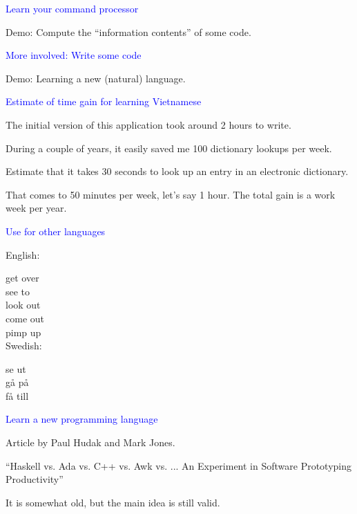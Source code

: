 \documentclass{slides}
\newcommand{\ti}[1]{\begin{center}\Large{\textcolor{blue}{#1}}\end{center}}
\begin{document}
\begin{slide}\ti{Learn your command processor}

Demo: Compute the ``information contents'' of some code.

\vfill\end{slide}
\begin{slide}\ti{More involved: Write some code}

Demo: Learning a new (natural) language.

\vfill\end{slide}
\begin{slide}\ti{Estimate of time gain for learning Vietnamese}

The initial version of this application took around 2 hours to write.

During a couple of years, it easily saved me 100 dictionary lookups
per week.  

Estimate that it takes 30 seconds to look up an entry in an electronic
dictionary.

That comes to 50 minutes per week, let's say 1 hour.  The total gain
is a work week per year.

\vfill\end{slide}
\begin{slide}\ti{Use for other languages}

English:

get over\\
see to\\
look out\\
come out\\
pimp up\\

Swedish:

se ut\\
gå på\\
få till\\

\vfill\end{slide}
\begin{slide}\ti{Learn a new programming language}

Article by Paul Hudak and Mark Jones.

``Haskell vs. Ada vs. C++ vs. Awk vs. ... An Experiment in Software
Prototyping Productivity''

It is somewhat old, but the main idea is still valid.

\vfill\end{slide}
\end{document}
